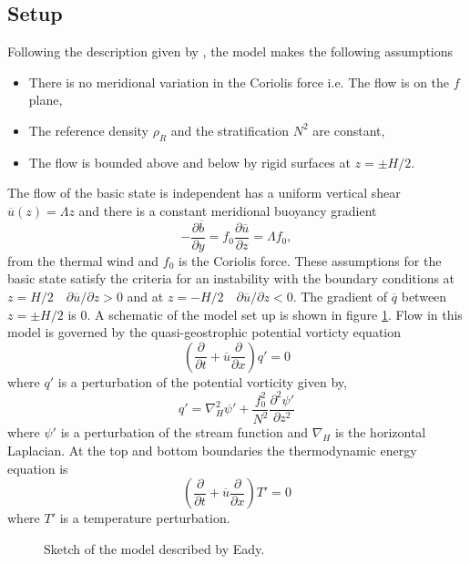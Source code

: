 \documentclass[a4paper,12pt]{article}
\begin{document}
\subsection{Setup}
Following the description given by \cite{Hoskins2013}, the model makes the following assumptions
\begin{itemize}
  \item There is no meridional variation in the Coriolis force i.e. The flow is on the $f$ plane,
  \item The reference density $\rho_R$ and the stratification $N^2$ are constant,
  \item The flow is bounded above and below by rigid surfaces at $z=\pm H/2$. 
\end{itemize}
The flow of the basic state is independent has a uniform vertical shear $\overline{u}(z) = \Lambda z$ and there is a constant meridional buoyancy gradient 
\begin{equation}
  -\frac{\partial\overline{b}}{\partial y} = f_0\frac{\partial\overline{u}}{\partial z}= \Lambda f_0,
\end{equation}
from the thermal wind and $f_0$ is the Coriolis force. These assumptions for the basic state satisfy the criteria for an instability with the boundary conditions at $ z= H/2 \quad \partial\overline u/\partial z > 0$ and at $ z= -H/2 \quad \partial\overline{u}/\partial z < 0$. The gradient of $\overline{q}$ between $z=\pm H/2$ is 0. A schematic of the model set up is shown in figure \ref{eadyexample}. Flow in this model is governed by the quasi-geostrophic potential vorticty equation
\begin{equation}
  \left(\frac{\partial}{\partial t} +\overline{u}\frac{\partial}{\partial x}\right)q' = 0 
\end{equation}
where $q'$ is a perturbation of the potential vorticity given by,
\begin{equation}
  q' = \nabla^2_{H} \psi' +\frac{f_0^2}{N^2}\frac{\partial^2\psi'}{\partial z^2}
\end{equation}
where $\psi'$ is a perturbation of the stream function and $\nabla_H$ is the horizontal Laplacian. At the top and bottom boundaries the thermodynamic energy equation is 
\begin{equation}
  \left(\frac{\partial}{\partial t}+\overline{u}\frac{\partial}{\partial x}\right)T' = 0
\end{equation}
where $T'$ is a temperature perturbation. 
\begin{figure}
  \centering
  
  \caption{Sketch of the model described by Eady.}
  \label{eadyexample}
\end{figure}
\end{document}
